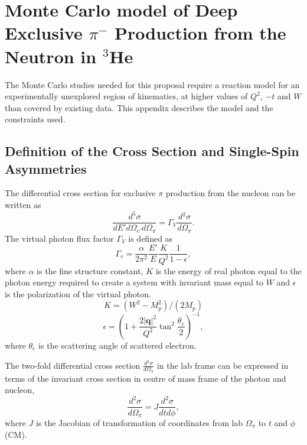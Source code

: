 \section{Monte Carlo model of Deep Exclusive $\pi^{-}$ Production from the
  Neutron in $^{3}$He 
\label{sec:generator}}

The Monte Carlo studies needed for this proposal require a reaction
model for an experimentally unexplored region of kinematics, at higher
values of $Q^2$, $-t$ and $W$ than covered by existing data.  This appendix
describes the model and the constraints used.

\subsection{Definition of the Cross Section and Single-Spin Asymmetries}

The differential cross section for exclusive $\pi$ production from the nucleon
can be written as
\begin{equation}
  \frac{d^{5} \sigma}{dE' d\Omega_{e'} d\Omega_{\pi}} = \Gamma_{V} \frac{d{^2}
  \sigma}{d\Omega_{\pi}}.
\end{equation}
The virtual photon flux factor $\Gamma_{V}$ is defined as
\begin{equation}
  \Gamma_v=\frac{\alpha}{2\pi^2} \frac{E'}{E} \frac{K}{Q^2}\frac{1}{1-\epsilon},
\end{equation}
where $\alpha$ is the fine structure constant, $K$ is the energy of real photon
equal to the photon energy required to create a system with invariant mass
equal to $W$ and $\epsilon$ is the polarization of the virtual photon.
\begin{equation}
  K=(W^2-M_p^2)/(2 M_p)
\end{equation}
\begin{equation}
  \epsilon=\left(1+\frac{2 |\mathbf{q}|^2}{Q^2} \tan^2\frac{\theta_{e}}{2}
  \right)^{-1},
\end{equation}
where $\theta_{e}$ is the scattering angle of scattered electron.

The two-fold differential cross section $\frac{d{^2} \sigma}{d\Omega_{\pi}}$ in
the lab frame can be expressed in terms of the invariant cross section
in centre of mass frame of the photon and nucleon,
\begin{equation}
  \frac{d^2 \sigma}{d\Omega_\pi}= J \frac{d^2 \sigma}{dt d\phi},
\end{equation}
where $J$ is the Jacobian of transformation of coordinates from lab
$\Omega_{\pi}$ to $t$ and $\phi$ (CM). 

